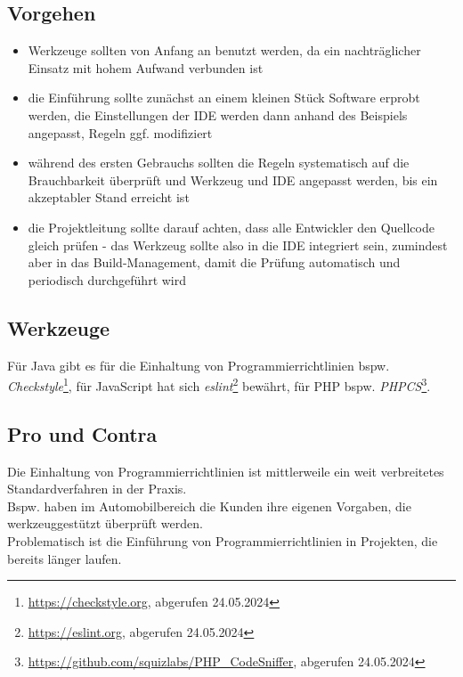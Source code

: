 \subsection*{Vorgehen}
\begin{itemize}
    \item Werkzeuge sollten von Anfang an benutzt werden, da ein nachträglicher Einsatz mit hohem Aufwand verbunden ist
    \item die Einführung sollte zunächst an einem kleinen Stück Software erprobt werden, die Einstellungen der IDE werden dann anhand des Beispiels angepasst, Regeln ggf. modifiziert
    \item während des ersten Gebrauchs sollten die Regeln systematisch auf die Brauchbarkeit überprüft und Werkzeug und IDE  angepasst werden, bis ein akzeptabler Stand erreicht ist
    \item die Projektleitung sollte darauf achten, dass alle Entwickler den Quellcode gleich prüfen - das Werkzeug sollte also in die IDE integriert sein, zumindest aber in das Build-Management, damit die Prüfung automatisch und periodisch durchgeführt wird
\end{itemize}

\subsection*{Werkzeuge}
Für Java gibt es für die Einhaltung von Programmierrichtlinien bspw. \textit{Checkstyle}\footnote{
    \url{https://checkstyle.org}, abgerufen 24.05.2024
}, für JavaScript hat sich \textit{eslint}\footnote{
    \url{https://eslint.org}, abgerufen 24.05.2024
} bewährt, für PHP bspw. \textit{PHPCS}\footnote{
\url{https://github.com/squizlabs/PHP_CodeSniffer}, abgerufen 24.05.2024
}.

\subsection*{Pro und Contra}
Die Einhaltung von Programmierrichtlinien ist mittlerweile ein weit verbreitetes Standardverfahren in der Praxis.\\
Bspw. haben im Automobilbereich die Kunden ihre eigenen Vorgaben, die werkzeuggestützt überprüft werden.\\
Problematisch ist die Einführung von Programmierrichtlinien in Projekten, die bereits länger laufen.



